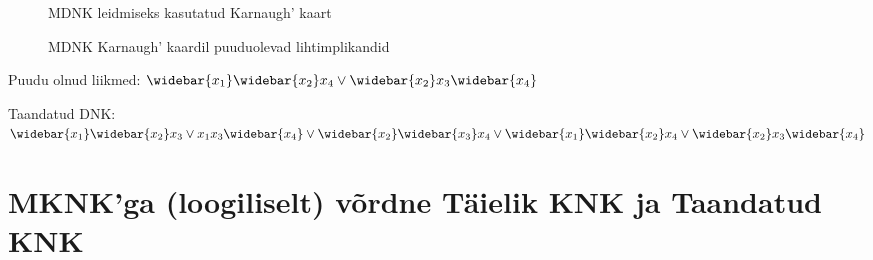 \documentclass{article}
\begin{document}
\begin{figure}[H]
\centering
\begin{Karnaugh}
\end{Karnaugh}
\caption{MDNK leidmiseks kasutatud Karnaugh' kaart}
\label{fig:karnaugh-piirkond1}
\end{figure}

\begin{figure}[H]
\centering
\begin{Karnaugh}
\end{Karnaugh}
\caption{MDNK Karnaugh' kaardil puuduolevad lihtimplikandid}
\label{fig:karnaugh-piirkond1}
\end{figure}
Puudu olnud liikmed: $\widebar{x_1}\widebar{x_2}x_4 \lor \widebar{x_2}x_3\widebar{x_4}$

Taandatud DNK: $\widebar{x_1}\widebar{x_2}x_3 \lor x_1x_3\widebar{x_4} \lor \widebar{x_2}\widebar{x_3}x_4 \lor \widebar{x_1}\widebar{x_2}x_4 \lor \widebar{x_2}x_3\widebar{x_4}$
\section{MKNK'ga (loogiliselt) võrdne Täielik KNK ja Taandatud KNK}
\end{document}
